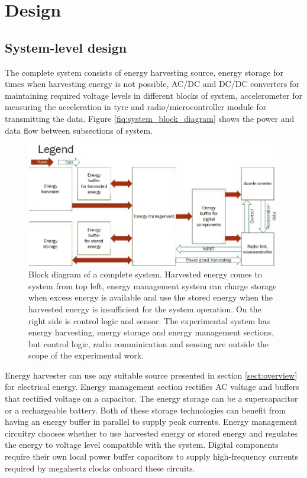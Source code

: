 \section{Design}\label{sect:design}
\subsection{System-level design}
The complete system consists of energy harvesting source, energy storage for times when harvesting energy is not possible, AC/DC and DC/DC converters for maintaining required voltage levels in different blocks of system, accelerometer for measuring the acceleration in tyre and radio/microcontroller module for transmitting the data. Figure \ref{fiq:system_block_diagram} shows the power and data flow between subsections of system. 


\begin{figure}[htb]
\begin{center}
\includegraphics[width=\columnwidth]{images/own_dwg/system_block_diagram.jpg}
\end{center}
\caption{\label{fiq:system_block_diagram} Block diagram of a complete system. Harvested energy comes to system from top left, energy management system can charge storage when excess energy is available and use the stored energy when the harvested energy is insufficient for the system operation. On the right side is control logic and sensor. The experimental system has energy harvesting, energy storage and energy management sections, but control logic, radio comminication and sensing are outside the scope of the experimental work.}
\label{liitekuva}
\end{figure}

Energy harvester can use any suitable source presented in section \ref{sect:overview} for electrical energy. Energy management section rectifies AC voltage and buffers that rectified voltage on a capacitor. The energy storage can be a supercapacitor or a rechargeable battery. Both of these storage technologies can benefit from having an energy buffer in parallel to supply peak currents. Energy management circuitry chooses whether to use harvested energy or stored energy and regulates the energy to voltage level compatible with the system. Digital components require their own local power buffer capacitors to supply high-frequency currents required by megahertz clocks onboard these circuits.

